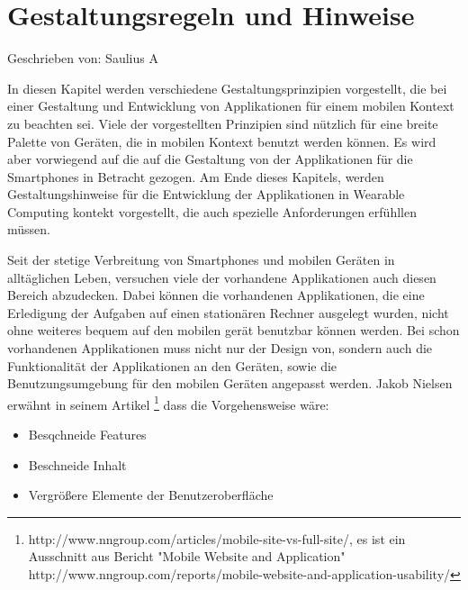 
\section{Gestaltungsregeln und Hinweise}

Geschrieben von: Saulius A

In diesen Kapitel werden verschiedene Gestaltungsprinzipien vorgestellt, die bei einer Gestaltung und Entwicklung von Applikationen für einem mobilen Kontext zu beachten sei. Viele der vorgestellten Prinzipien sind nützlich für eine breite Palette von Geräten, die in mobilen Kontext benutzt werden können. Es wird aber vorwiegend auf die auf die Gestaltung von der Applikationen für die Smartphones in Betracht gezogen. Am Ende dieses Kapitels, werden Gestaltungshinweise für die Entwicklung der Applikationen in Wearable Computing kontekt vorgestellt, die auch spezielle Anforderungen erfühllen müssen.



Seit der stetige Verbreitung von Smartphones und mobilen Geräten in alltäglichen Leben, versuchen viele der vorhandene Applikationen auch diesen Bereich abzudecken. Dabei können die vorhandenen Applikationen, die eine Erledigung der Aufgaben auf einen stationären Rechner ausgelegt wurden, nicht ohne weiteres bequem auf den mobilen gerät benutzbar können werden. Bei schon vorhandenen Applikationen muss nicht nur der Design von, sondern auch die Funktionalität der Applikationen an den Geräten, sowie die Benutzungsumgebung für den mobilen Geräten angepasst werden. Jakob Nielsen erwähnt in seinem Artikel \footnote{http://www.nngroup.com/articles/mobile-site-vs-full-site/, es ist ein Ausschnitt aus Bericht "Mobile Website and Application" http://www.nngroup.com/reports/mobile-website-and-application-usability/} dass die Vorgehensweise wäre:

\begin{itemize}
	\item Besqchneide Features
	\item Beschneide Inhalt
	\item Vergrößere Elemente der Benutzeroberfläche
\end{itemize}

